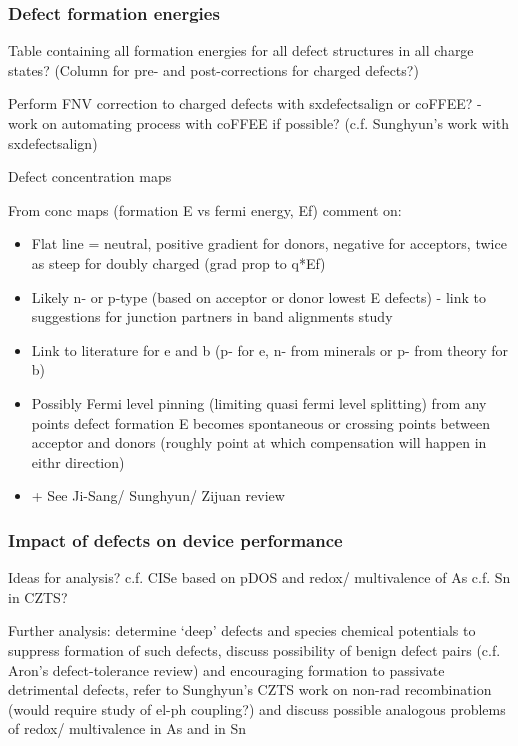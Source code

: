 \documentclass[11pt, twoside]{report}
\begin{document}
\subsubsection{Defect formation energies}

Table containing all formation energies for all defect structures in all charge states? (Column for pre- and post-corrections for charged defects?)

Perform FNV correction to charged defects with sxdefectsalign or coFFEE? - work on automating process with coFFEE if possible? (c.f. Sunghyun's work with sxdefectsalign)

Defect concentration maps

From conc maps (formation E vs fermi energy, Ef) comment on:
\begin{itemize}
\item Flat line = neutral, positive gradient for donors, negative for acceptors, twice as steep for doubly charged (grad prop to q*Ef)
\item Likely n- or p-type (based on acceptor or donor lowest E defects) - link to suggestions for junction partners in band alignments study
\item Link to literature for e and b (p- for e, n- from minerals or p- from theory for b)
\item Possibly Fermi level pinning (limiting quasi fermi level splitting) from any points defect formation E becomes spontaneous or crossing points between acceptor and donors (roughly point at which compensation will happen in eithr direction)
\item + See Ji-Sang/ Sunghyun/ Zijuan review
\end{itemize}

\subsubsection{Impact of defects on device performance}

Ideas for analysis? c.f. CISe based on pDOS and redox/ multivalence of As c.f. Sn in CZTS?

Further analysis: determine `deep' defects and species chemical potentials to suppress formation of such defects, discuss possibility of benign defect pairs (c.f. Aron's defect-tolerance review) and encouraging formation to passivate detrimental defects, refer to Sunghyun's CZTS work on non-rad recombination (would require study of el-ph coupling?) and discuss possible analogous problems of redox/ multivalence in As and in Sn
\end{document}
